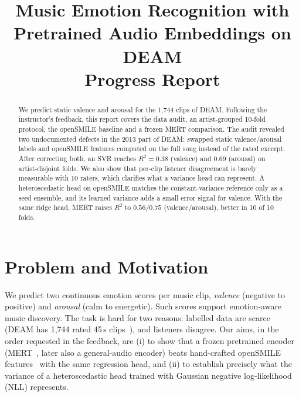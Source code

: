 \documentclass[conference]{IEEEtran}
\newcommand{\R}{R^2}
\begin{document}
\title{Music Emotion Recognition with Pretrained Audio Embeddings on DEAM\\[0.3em]
\large Progress Report}

\author{
}

\maketitle

\begin{abstract}
We predict static valence and arousal for the 1{,}744 clips of DEAM. Following
the instructor's feedback, this report covers the data audit, an artist-grouped
10-fold protocol, the openSMILE baseline and a frozen MERT comparison. The audit revealed two
undocumented defects in the 2013 part of DEAM: swapped static valence/arousal
labels and openSMILE features computed on the full song instead of the rated
excerpt. After correcting both, an SVR reaches $\R=0.38$ (valence) and $0.69$
(arousal) on artist-disjoint folds. We also show that per-clip listener
disagreement is barely measurable with 10 raters, which clarifies what a
variance head can represent. A heteroscedastic head on openSMILE matches the
constant-variance reference only as a seed ensemble, and its learned variance
adds a small error signal for valence. With the same ridge head, MERT
raises $\R$ to $0.56$/$0.75$ (valence/arousal), better in 10 of 10 folds.
\end{abstract}

\section{Problem and Motivation}
We predict two continuous emotion scores per music clip, \emph{valence}
(negative to positive) and \emph{arousal} (calm to energetic). Such scores
support emotion-aware music discovery. The task is hard for two reasons:
labelled data are scarce (DEAM has 1{,}744 rated 45\,s
clips~\cite{aljanaki2017}), and listeners disagree. Our aims, in the order
requested in the feedback, are (i) to show that a frozen pretrained encoder
(MERT~\cite{li2024mert}, later also a general-audio encoder) beats
hand-crafted openSMILE features~\cite{eyben2010} with the same regression
head, and (ii) to establish precisely what the
variance of a heteroscedastic head trained with Gaussian negative
log-likelihood (NLL) represents.
\end{document}
